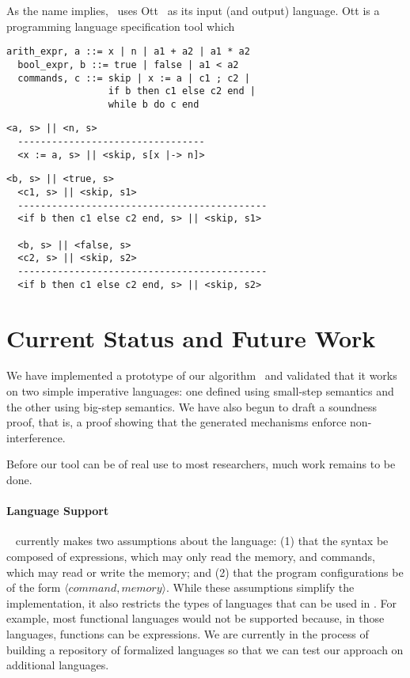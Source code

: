 \documentclass[sigplan,10pt]{acmart}\settopmatter{printfolios=true,printccs=false,printacmref=false}
\begin{document}
As the name implies, \ottifc\ uses Ott~\cite{DBLP:journals/jfp/SewellNOPRSS10} as its input (and output) language. Ott is a programming language specification tool which 



\begin{lstlisting}[captionpos=b,caption=Ott syntax of a simple imperative language]
  arith_expr, a ::= x | n | a1 + a2 | a1 * a2 
  bool_expr, b ::= true | false | a1 < a2
  commands, c ::= skip | x := a | c1 ; c2 | 
                  if b then c1 else c2 end | 
                  while b do c end   
\end{lstlisting}

\begin{lstlisting}[captionpos=b,caption={Ott big-step semantics of the assign command}]
  <a, s> || <n, s>
  ---------------------------------
  <x := a, s> || <skip, s[x |-> n]>
\end{lstlisting}

\begin{lstlisting}[captionpos=b,caption={Ott big-step semantics of the if command}]
  <b, s> || <true, s>
  <c1, s> || <skip, s1>
  --------------------------------------------
  <if b then c1 else c2 end, s> || <skip, s1>
  
  <b, s> || <false, s>
  <c2, s> || <skip, s2>
  --------------------------------------------
  <if b then c1 else c2 end, s> || <skip, s2>
\end{lstlisting}

\section{Current Status and Future Work}
We have implemented a prototype of our algorithm~\cite{GitHub:ott-ifc} and validated that it works on two simple imperative languages: one defined using small-step semantics and the other using big-step semantics. We have also begun to draft a soundness proof, that is, a proof showing that the generated mechanisms enforce non-interference.

Before our tool can be of real use to most researchers, much work remains to be done.

\paragraph{Language Support} \ottifc~ currently makes two assumptions about the language: (1) that the syntax be composed of expressions, which may only read the memory, and commands, which may read or write the memory; and (2) that the program configurations be of the form $\langle command, memory\rangle$. While these assumptions simplify the implementation, it also restricts the types of languages that can be used in \ottifc. For example, most functional languages would not be supported because, in those languages, functions can be expressions. We are currently in the process of building a repository of formalized languages so that we can test our approach on additional languages. 
\end{document}
